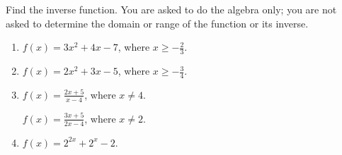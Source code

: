Find the inverse function. You are asked to do the algebra only; you are not asked to determine the domain or range of the function or its inverse. 
\begin{enumerate}
\item $f(x)= 3x^2+4x-7$, where $x\geq -\frac{2}{3}$.

\item $f(x)= 2x^2+3x-5$, where $x\geq -\frac{3}{4}$.

\item $f(x)= \frac{2x+5}{x-4}$, where $x\neq 4$.

  $f(x)= \frac{3x+5}{2x-4}$, where $x\neq 2$.

%

\item $f(x)=2^{2x}+2^{x}-2$.

\end{enumerate}
